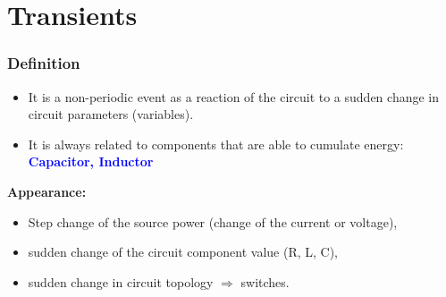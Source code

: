 \documentclass{beamer}
\begin{document}
\section{\texorpdfstring{Transients}{Transients}}
	\begin{frame}
    \frametitle{Definition}
		
		\begin{itemize}
			\item It is a non-periodic event as a reaction of the circuit to a sudden change in circuit parameters (variables).
			\item It is always related to components that are able to cumulate energy: \textcolor{blue}{\textbf{Capacitor, Inductor}}
		\end{itemize}
		\textbf{Appearance:}
		
		\begin{itemize}
			\item Step change of the source power (change of the current or voltage),
			\item sudden change of the circuit component value (R, L, C),
			\item sudden change in circuit topology $\Rightarrow$ switches.
		\end{itemize}
  \end{frame}
\end{document}
